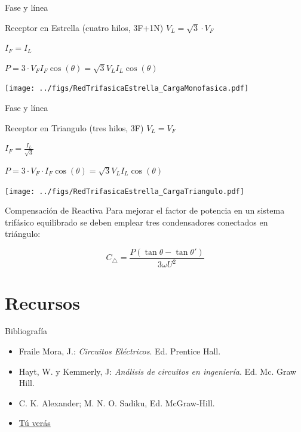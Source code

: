 \documentclass[xcolor={usenames,svgnames,dvipsnames}]{beamer}
\begin{document}
\begin{frame}[label={sec:org5b6ed49}]{Fase y línea}
\begin{block}{Receptor en Estrella (cuatro hilos, 3F+1N)}
\(V_{L}=\sqrt{3}\cdot V_{F}\) 

\(I_{F}=I_{L}\)

\(P=3\cdot V_{F}I_{F}\cos(\theta)=\sqrt{3}V_{L}I_{L}\cos(\theta)\)
\begin{center}
\texttt{[image: ../figs/RedTrifasicaEstrella\_CargaMonofasica.pdf]}
\end{center}
\end{block}
\end{frame}

\begin{frame}[label={sec:orgfcecf27}]{Fase y línea}
\begin{block}{Receptor en Triangulo (tres hilos, 3F)}
\(V_{L}=V_{F}\) 

\(I_{F}=\frac{I_{L}}{\sqrt{3}}\)

\(P=3\cdot V_{F}\cdot I_{F}\cos(\theta)=\sqrt{3}V_{L}I_{L}\cos(\theta)\)
\begin{center}
\texttt{[image: ../figs/RedTrifasicaEstrella\_CargaTriangulo.pdf]}
\end{center}
\end{block}
\end{frame}

\begin{frame}[label={sec:org8b0eeaf}]{Compensación de Reactiva}
Para mejorar el factor de potencia en un sistema trifásico equilibrado se deben emplear \alert{tres condensadores conectados en triángulo}:

\[
  C_\triangle = \frac{P(\tan \theta - \tan \theta')}{3\omega U^2}
\]
\end{frame}

\section{Recursos}
\label{sec:orgfc2e17f}

\begin{frame}[label={sec:org839add7}]{Bibliografía}
\begin{itemize}
\item \alert{Fraile Mora, J.}: \emph{Circuitos Eléctricos}. Ed. Prentice Hall.

\item \alert{Hayt, W. y Kemmerly, J}: \emph{Análisis de circuitos en ingeniería}. Ed.
Mc. Graw Hill.

\item \alert{C. K. Alexander; M. N. O. Sadiku}, Ed. McGraw-Hill.

\item \href{http://tuveras.com/index.html}{Tú verás}
\end{itemize}
\end{frame}
\end{document}
